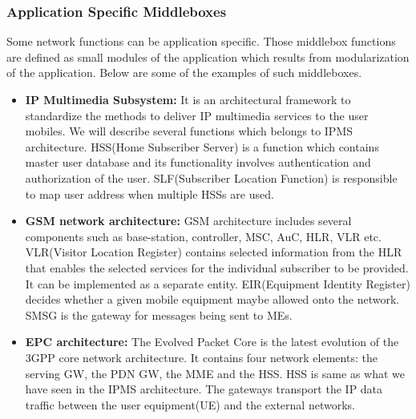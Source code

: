 \documentclass[a4paper,11pt]{report}
\begin{document}
\subsubsection{Application Specific Middleboxes}
Some network functions can be application specific. Those middlebox functions are defined as small modules of the application which results from modularization of the application. Below are some of the examples of such middleboxes.   
\begin{itemize}
\item \textbf{IP Multimedia Subsystem: }It is an architectural framework to standardize the methods to deliver IP multimedia services to the user mobiles. We will describe several functions which belongs to IPMS architecture. HSS(Home Subscriber Server) is a function which contains master user database and its functionality involves authentication and authorization of the user. SLF(Subscriber Location Function) is responsible to map user address when multiple HSSs are used.
\item \textbf{GSM network architecture: }GSM architecture includes several components such as base-station, controller, MSC, AuC, HLR, VLR etc. VLR(Visitor Location Register) contains selected information from the HLR that enables the selected services for the individual subscriber to be provided. It can be implemented as a separate entity. EIR(Equipment Identity Register) decides whether a given mobile equipment maybe allowed onto the network. SMSG is the gateway for messages being sent to MEs.    
\item \textbf{EPC architecture: }The Evolved Packet Core is the latest evolution of the 3GPP core network architecture. It contains four network elements: the serving GW, the PDN GW, the MME and the HSS. HSS is same as what we have seen in the IPMS architecture. The gateways transport the IP data traffic between the user equipment(UE) and the external networks. 	 	 
\end{itemize} 
\end{document}
